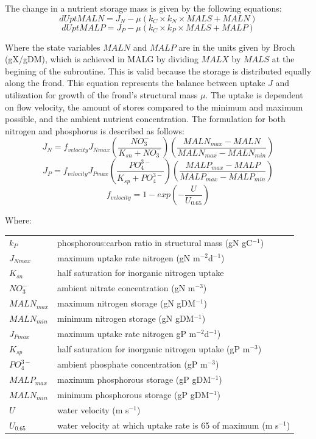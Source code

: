 \documentclass{deltares_manual}
\begin{document}
The change in a nutrient storage mass is given by the following equations:
\begin{equation}
dUptMALN = J_N - \mu(k_C \times k_N \times MALS + MALN)
\end{equation}
\begin{equation}
dUptMALP = J_P - \mu(k_C \times k_P \times MALS + MALP)
\end{equation}

Where the state variables $MALN$ and $MALP$ are in the units given by Broch (gX/gDM), which is achieved in MALG by dividing $MALX$ by $MALS$ at the begining of the subroutine. This is valid because the storage is distributed equally along the frond. This equation represents the balance between uptake $J$ and utilization for growth of the frond's structural mass $\mu$. The uptake is dependent on flow velocity, the amount of stores compared to the minimum and maximum possible, and the ambient nutrient concentration. The formulation for both nitrogen and phosphorus is described as follows:
\begin{equation}
J_N = f_{velocity}J_{Nmax}(\frac{NO_3^-}{K_{sn}+NO_3^-})(\frac{MALN_{max}-MALN}{MALN_{max}-MALN_{min}})
\end{equation}
\begin{equation}
J_P = f_{velocity}J_{Pmax}(\frac{PO_4^{3-}}{K_{sp}+PO_4^{3-}})(\frac{MALP_{max}-MALP}{MALP_{max}-MALP_{min}})
\end{equation}
\begin{equation}
f_{velocity} = 1-exp(-\frac{U}{U_{0.65}})
\end{equation}

Where:\\

\begin{tabular}{ll}
$k_P$        & phosphorous:carbon ratio in structural mass (gN gC$^{-1}$)\\
$J_{Nmax}$   & maximum uptake rate nitrogen (gN m$^{-2}$d$^{-1}$)\\
$K_{sn}$     & half saturation for inorganic nitrogen uptake\\
$NO_3^-$     & ambient nitrate concentration (gN m$^{-3}$)\\
$MALN_{max}$ & maximum nitrogen storage (gN gDM$^{-1}$)\\
$MALN_{min}$ & minimum nitrogen storage (gN gDM$^{-1}$)\\
$J_{Pmax}$   & maximum uptake rate nitrogen gP m$^{-2}$d$^{-1}$)\\
$K_{sp}$     & half saturation for inorganic nitrogen uptake (gP m$^{-3}$)\\
$PO_4^{3-}$  & ambient phosphate concentration (gP m$^{-3}$)\\
$MALP_{max}$ & maximum phosphorous storage (gP gDM$^{-1}$)\\
$MALN_{min}$ & minimum phosphorous storage (gP gDM$^{-1}$)\\
$U$          & water velocity (m s$^{-1}$)\\
$U_{0.65}$   & water velocity at which uptake rate is 65 of maximum (m s$^{-1}$)\\
\end{tabular}
\end{document}
